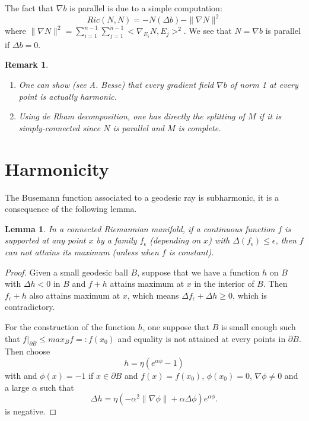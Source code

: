 \documentclass[11pt]{article}
\newtheorem{remark}{Remark}
\newtheorem{lemma}[theorem]{Lemma}
\begin{document}
The fact that \(\nabla b\) is parallel is due to a simple computation:
\[
Ric(N,N) = -N(\Delta b) - \|\nabla N \|^2
\]
where \(\|\nabla N\|^2 = \sum_{i=1}^{n-1}\sum_{j=1}^{n-1}<\nabla_{E_i}N, E_j>^2\). We see that \(N = \nabla b\) is parallel if \(\Delta b =0\).

\begin{remark}
\begin{enumerate}
\item One can show (see A. Besse) that every gradient field \(\nabla b\) of norm 1 at every point is actually harmonic.
\item Using de Rham decomposition, one has directly the splitting of \(M\) if it is simply-connected
since \(N\) is parallel and \(M\) is complete.
\end{enumerate}
\end{remark}

\section{Harmonicity}
\label{sec:org7bd4e92}
The Busemann function associated to a geodesic ray is subharmonic, it is a consequence of the
following lemma.


\begin{lemma}
\label{lem:1}%
In a connected Riemannian manifold, if a continuous function \(f\) is supported at any point \(x\) by
a family \(f_\epsilon\) (depending on \(x\)) with \(\Delta(f_\epsilon)\leq \epsilon\), then \(f\) can not
attains its maximum (unless when \(f\) is constant).
\end{lemma}

\begin{proof}
Given a small geodesic ball \(B\), suppose that we have a function \(h\) on \(B\) with \(\Delta h <0\) in \(B\) and
\(f+h\) attains maximum at \(x\) in the interior of \(B\). Then \(f_\epsilon + h\) also attains maximum at
\(x\), which means \(\Delta f_\epsilon + \Delta h \geq 0\), which is contradictory.

For the construction of the function \(h\), one suppose that \(B\) is small enough such that
\(f|_{\partial B} \leq max_B f=: f(x_0)\) and equality is not attained at every points in \(\partial B\). Then
choose
\[
h = \eta (e^{\alpha \phi} - 1)
\]
with and \(\phi(x) = -1\) if \(x\in \partial B\) and \(f(x) = f(x_0)\), \(\phi(x_0) = 0\),
\(\nabla \phi \ne 0\) and a large  \(\alpha\) such that
\[
\Delta h = \eta (-\alpha^2\| \nabla \phi\| + \alpha \Delta \phi)e^{\alpha \phi}.
\]
is negative.
\end{proof}
\end{document}
